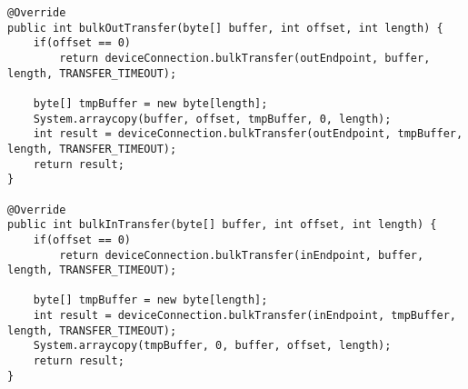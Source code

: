 \begin{lstlisting}[caption=Workaround for the missing method in API level lower 18., label=listing:workaround_api]
@Override
public int bulkOutTransfer(byte[] buffer, int offset, int length) {
	if(offset == 0)
		return deviceConnection.bulkTransfer(outEndpoint, buffer, length, TRANSFER_TIMEOUT);
	
	byte[] tmpBuffer = new byte[length];
	System.arraycopy(buffer, offset, tmpBuffer, 0, length);
	int result = deviceConnection.bulkTransfer(outEndpoint, tmpBuffer, length, TRANSFER_TIMEOUT);
	return result;
}

@Override
public int bulkInTransfer(byte[] buffer, int offset, int length) {
	if(offset == 0)
		return deviceConnection.bulkTransfer(inEndpoint, buffer, length, TRANSFER_TIMEOUT);
	
	byte[] tmpBuffer = new byte[length];
	int result = deviceConnection.bulkTransfer(inEndpoint, tmpBuffer, length, TRANSFER_TIMEOUT);
	System.arraycopy(tmpBuffer, 0, buffer, offset, length);
	return result;
}
\end{lstlisting}